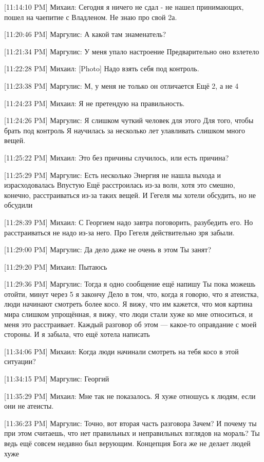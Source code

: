 \documentclass{article}
\begin{document}
[11:14:10 PM] Михаил:
Сегодня я ничего не сдал - не нашел принимающих, пошел на чаепитие с Владленом.
 Не знаю про свой 2а.

[11:20:46 PM] Маргулис:
А какой там знаменатель?

[11:21:34 PM] Маргулис:
У меня упало настроение
 Предварительно оно взлетело

[11:22:28 PM] Михаил:
[Photo]
 Надо взять себя под контроль.

[11:23:38 PM] Маргулис:
М, у меня не только он отличается
 Ещё 2, а не 4

[11:24:23 PM] Михаил:
Я не претендую на правильность.

[11:24:26 PM] Маргулис:
Я слишком чуткий человек для этого
 Для того, чтобы брать под контроль
 Я научилась за несколько лет улавливать слишком много вещей.

[11:25:22 PM] Михаил:
Это без причины случилось, или есть причина?

[11:25:29 PM] Маргулис:
Есть несколько
 Энергия не нашла выхода и израсходовалась
 Впустую
 Ещё расстроилась из-за волн, хотя это смешно, конечно, расстраиваться из-за таких вещей.
 И Гегеля мы хотели обсудить, но не обсудили

[11:28:39 PM] Михаил:
С Георгием надо завтра поговорить, разубедить его. Но расстраиваться не надо из-за него.
 Про Гегеля действительно зря забыли.

[11:29:00 PM] Маргулис:
Да дело даже не очень в этом
 Ты занят?

[11:29:20 PM] Михаил:
Пытаюсь

[11:29:36 PM] Маргулис:
Тогда я одно сообщение ещё напишу
 Ты пока можешь отойти, минут через 5 я закончу
 Дело в том, что, когда я говорю, что я атеистка, люди начинают смотреть более косо. Я вижу, что им кажется, что моя картина мира слишком упрощённая, я вижу, что люди стали хуже ко мне относиться, и меня это расстраивает. Каждый разговор об этом — какое-то оправдание с моей стороны. И я забыла, что ещё хотела написать

[11:34:06 PM] Михаил:
Когда люди начинали смотреть на тебя косо в этой ситуации?

[11:34:15 PM] Маргулис:
Георгий

[11:35:29 PM] Михаил:
Мне так не показалось.
 Я хуже отношусь к людям, если они не атеисты.

[11:36:23 PM] Маргулис:
Точно, вот вторая часть разговора
 Зачем? И почему ты при этом считаешь, что нет правильных и неправильных взглядов на мораль? Ты ведь ещё совсем недавно был верующим. Концепция Бога же не делает людей хуже
\end{document}

